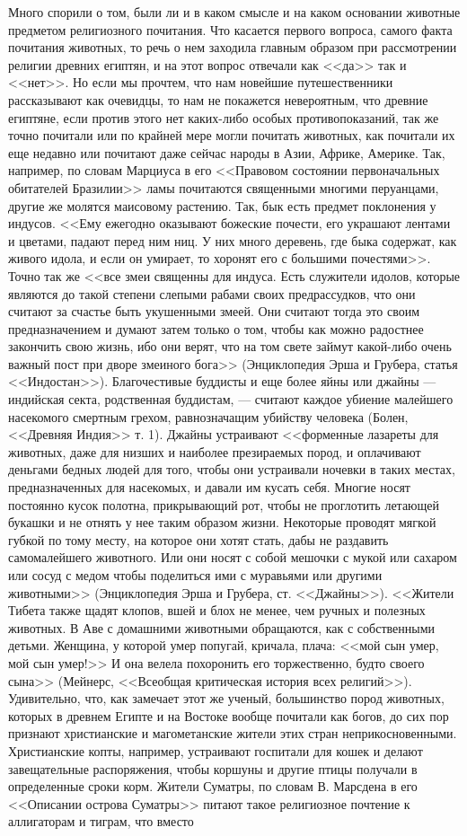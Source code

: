 \documentclass[12pt]{article}
\begin{document}
Много спорили о том, были ли и в каком смысле и на каком основании животные предметом религиозного почитания. Что касается первого вопроса, самого факта почитания животных, то речь о нем заходила главным образом при рассмотрении религии древних египтян, и на этот вопрос отвечали как <<да>>  так и <<нет>>. Но если мы прочтем, что нам новейшие путешественники рассказывают как очевидцы, то нам не покажется невероятным, что древние египтяне, если против этого нет каких-либо особых противопоказаний, так же точно почитали или по крайней мере могли почитать животных, как почитали их еще недавно или почитают даже сейчас народы в Азии, Африке, Америке. Так, например, по словам Марциуса в его <<Правовом состоянии первоначальных обитателей Бразилии>>  ламы почитаются священными многими перуанцами, другие же молятся маисовому растению. Так, бык есть предмет поклонения у индусов. <<Ему ежегодно оказывают божеские почести, его украшают лентами и цветами, падают перед ним ниц. У них много деревень, где быка содержат, как живого идола, и если он умирает, то хоронят его с большими почестями>>. Точно так же <<все змеи священны для индуса. Есть служители идолов, которые являются до такой степени слепыми рабами своих предрассудков, что они считают за счастье быть укушенными змеей. Они считают тогда это своим предназначением и думают затем только о том, чтобы как можно радостнее закончить свою жизнь, ибо они верят, что на том свете займут какой-либо очень важный пост при дворе змеиного бога>> (Энциклопедия Эрша и Грубера, статья <<Индостан>>). Благочестивые буддисты и еще более яйны или джайны --- индийская секта, родственная буддистам, --- считают каждое убиение малейшего насекомого смертным грехом, равнозначащим убийству человека (Болен, <<Древняя Индия>>  т. 1). Джайны устраивают <<форменные лазареты для животных, даже для низших и наиболее презираемых пород, и оплачивают деньгами бедных людей для того, чтобы они устраивали ночевки в таких местах, предназначенных для насекомых, и давали им кусать себя. Многие носят постоянно кусок полотна, прикрывающий рот, чтобы не проглотить летающей букашки и не отнять у нее таким образом жизни. Некоторые проводят мягкой губкой по тому месту, на которое они хотят стать, дабы не раздавить самомалейшего животного. Или они носят с собой мешочки с мукой или сахаром или сосуд с медом чтобы поделиться ими с муравьями или другими животными>> (Энциклопедия Эрша и Грубера, ст. <<Джайны>>). <<Жители Тибета также щадят клопов, вшей и блох не менее, чем ручных и полезных животных. В Аве с домашними животными обращаются, как с собственными детьми. Женщина, у которой умер попугай, кричала, плача: <<мой сын умер, мой сын умер!>> И она велела похоронить его торжественно, будто своего сына>> (Мейнерс, <<Всеобщая критическая история всех религий>>). Удивительно, что, как замечает этот же ученый, большинство пород животных, которых в древнем Египте и на Востоке вообще почитали как богов, до сих пор признают христианские и магометанские жители этих стран неприкосновенными. Христианские копты, например, устраивают госпитали для кошек и делают завещательные распоряжения, чтобы коршуны и другие птицы получали в определенные сроки корм. Жители Суматры, по словам В. Марсдена в его <<Описании острова Суматры>>  питают такое религиозное почтение к аллигаторам и тиграм, что вместо 
\end{document}
